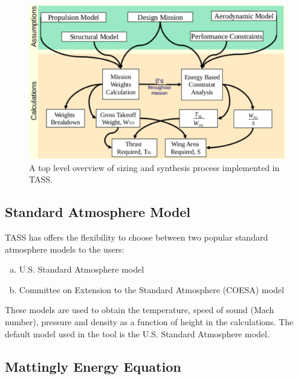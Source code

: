 \documentclass[pdftex,11pt,letter]{article}
\begin{document}
\begin{figure}[h!]
	\centering
	\includegraphics[scale=0.85]{figures/sizing_overview.pdf}
	\caption{A top level overview of sizing and synthesis process implemented in TASS\cite{MavrisNotes}.}
	\label{fig:sizing_overview}
\end{figure}

\subsection{Standard Atmosphere Model}
TASS has offers the flexibility to choose between two popular standard atmosphere models to the users:
\begin{enumerate}[(a)]
\item U.S. Standard Atmosphere model\cite{US}
\item  Committee on Extension to the Standard Atmosphere (COESA) model\cite{US}
\end{enumerate}
These models are used to obtain the temperature, speed of sound (Mach number), pressure and density as a function of height in the calculations. The default model used in the tool is the U.S. Standard Atmosphere model.

\subsection{Mattingly Energy Equation}
\end{document}
